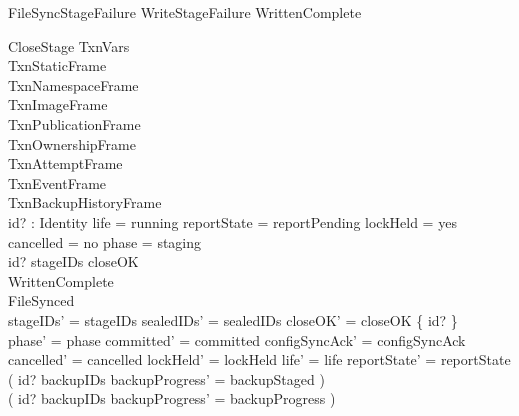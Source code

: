 \documentclass{article}
\begin{document}
\begin{schema}{FileSyncStageFailure}
	WriteStageFailure
	\where WrittenComplete
\end{schema}

\begin{schema}{CloseStage}
	\Delta TxnVars \\
	TxnStaticFrame \\
	TxnNamespaceFrame \\
	TxnImageFrame \\
	TxnPublicationFrame \\
	TxnOwnershipFrame \\
	TxnAttemptFrame \\
	TxnEventFrame \\
	TxnBackupHistoryFrame \\
	id? : Identity
	\where
	life = running \land reportState = reportPending \land lockHeld = yes \land
	cancelled = no \land phase = staging \\
	id? \in stageIDs \setminus closeOK \\
	WrittenComplete \\
	FileSynced \\
	stageIDs' = stageIDs \land sealedIDs' = sealedIDs \land
	closeOK' = closeOK \cup \{ id? \} \\
	phase' = phase \land committed' = committed \land
	configSyncAck' = configSyncAck \land cancelled' = cancelled \land
	lockHeld' = lockHeld \land life' = life \land reportState' = reportState \\
	( id? \in backupIDs \implies backupProgress' = backupStaged ) \\
	( id? \notin backupIDs \implies backupProgress' = backupProgress )
\end{schema}
\end{document}
